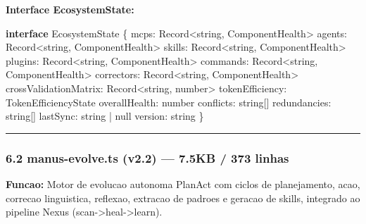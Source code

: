 \documentclass[
  12pt,
]{article}
\newenvironment{Shaded}{}{}
\newcommand{\BuiltInTok}[1]{\textcolor[rgb]{0.00,0.50,0.00}{#1}}
\newcommand{\DataTypeTok}[1]{\textcolor[rgb]{0.56,0.13,0.00}{#1}}
\newcommand{\KeywordTok}[1]{\textcolor[rgb]{0.00,0.44,0.13}{\textbf{#1}}}
\newcommand{\NormalTok}[1]{#1}
\newcommand{\OperatorTok}[1]{\textcolor[rgb]{0.40,0.40,0.40}{#1}}
\begin{document}
\textbf{Interface EcosystemState:}

\begin{Shaded}
\begin{Highlighting}[]
\KeywordTok{interface}\NormalTok{ EcosystemState \{}
\NormalTok{  mcps}\OperatorTok{:} \BuiltInTok{Record}\OperatorTok{\textless{}}\DataTypeTok{string}\OperatorTok{,}\NormalTok{ ComponentHealth}\OperatorTok{\textgreater{}}
\NormalTok{  agents}\OperatorTok{:} \BuiltInTok{Record}\OperatorTok{\textless{}}\DataTypeTok{string}\OperatorTok{,}\NormalTok{ ComponentHealth}\OperatorTok{\textgreater{}}
\NormalTok{  skills}\OperatorTok{:} \BuiltInTok{Record}\OperatorTok{\textless{}}\DataTypeTok{string}\OperatorTok{,}\NormalTok{ ComponentHealth}\OperatorTok{\textgreater{}}
\NormalTok{  plugins}\OperatorTok{:} \BuiltInTok{Record}\OperatorTok{\textless{}}\DataTypeTok{string}\OperatorTok{,}\NormalTok{ ComponentHealth}\OperatorTok{\textgreater{}}
\NormalTok{  commands}\OperatorTok{:} \BuiltInTok{Record}\OperatorTok{\textless{}}\DataTypeTok{string}\OperatorTok{,}\NormalTok{ ComponentHealth}\OperatorTok{\textgreater{}}
\NormalTok{  correctors}\OperatorTok{:} \BuiltInTok{Record}\OperatorTok{\textless{}}\DataTypeTok{string}\OperatorTok{,}\NormalTok{ ComponentHealth}\OperatorTok{\textgreater{}}
\NormalTok{  crossValidationMatrix}\OperatorTok{:} \BuiltInTok{Record}\OperatorTok{\textless{}}\DataTypeTok{string}\OperatorTok{,} \DataTypeTok{number}\OperatorTok{\textgreater{}}
\NormalTok{  tokenEfficiency}\OperatorTok{:}\NormalTok{ TokenEfficiencyState}
\NormalTok{  overallHealth}\OperatorTok{:} \DataTypeTok{number}
\NormalTok{  conflicts}\OperatorTok{:} \DataTypeTok{string}\NormalTok{[]}
\NormalTok{  redundancies}\OperatorTok{:} \DataTypeTok{string}\NormalTok{[]}
\NormalTok{  lastSync}\OperatorTok{:} \DataTypeTok{string} \OperatorTok{|} \DataTypeTok{null}
\NormalTok{  version}\OperatorTok{:} \DataTypeTok{string}
\NormalTok{\}}
\end{Highlighting}
\end{Shaded}

\begin{center}\rule{0.5\linewidth}{0.5pt}\end{center}

\subsubsection{6.2 manus-evolve.ts (v2.2) --- 7.5KB / 373
linhas}\label{manus-evolve.ts-v2.2-7.5kb-373-linhas}

\textbf{Funcao:} Motor de evolucao autonoma PlanAct com ciclos de
planejamento, acao, correcao linguistica, reflexao, extracao de padroes
e geracao de skills, integrado ao pipeline Nexus
(scan-\textgreater heal-\textgreater learn).
\end{document}

